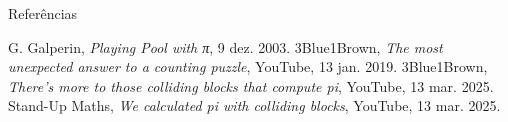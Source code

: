 \documentclass{beamer}
\begin{document}
\begin{frame}[allowframebreaks]{Referências}
  \begin{thebibliography}{}
     G. Galperin, \emph{Playing Pool with π}, 9 dez. 2003.
     3Blue1Brown, \emph{The most unexpected answer to a counting puzzle}, YouTube, 13 jan. 2019.
     3Blue1Brown, \emph{There's more to those colliding blocks that compute pi}, YouTube, 13 mar. 2025.
     Stand-Up Maths, \emph{We calculated pi with colliding blocks}, YouTube, 13 mar. 2025.
  \end{thebibliography}
\end{frame}
\end{document}

